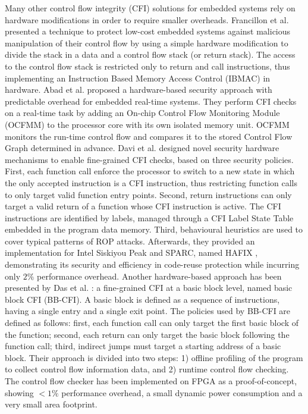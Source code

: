 Many other control flow integrity (CFI) solutions for embedded systems rely on hardware modifications in order to require smaller overheads.
Francillon et al. \cite{hardware-ibmac} presented a technique to protect low-cost embedded systems against malicious manipulation of their control flow
by using a simple hardware modification to divide the stack in a data and a control flow stack (or return stack). The access to the control flow stack is
restricted only to return and call instructions, thus implementing an Instruction Based Memory Access Control (IBMAC) in hardware.
Abad et al. \cite{ocfmm} proposed a hardware-based security approach with predictable overhead for embedded real-time systems.
They perform CFI checks on a real-time task by adding an On-chip Control Flow Monitoring Module (OCFMM) to the processor core with its own isolated memory unit.
OCFMM monitors the run-time control flow and compares it to the stored Control Flow Graph determined in advance.
Davi et al. \cite{fine-grained} designed novel security hardware mechanisms to enable fine-grained CFI checks, based on three security policies.
First, each function call enforce the processor to switch to a new state in which the only accepted instruction is a CFI instruction,
thus restricting function calls to only target valid function entry points. Second, return instructions can only target a valid return of a function whose CFI instruction is active.
The CFI instructions are identified by labels, managed through a CFI Label State Table embedded in the program data memory.
Third, behavioural heuristics are used to cover typical patterns of ROP attacks.
Afterwards, they provided an implementation for Intel Siskiyou Peak and SPARC, named HAFIX \cite{hafix},
demonstrating its security and efficiency in code-reuse protection while incurring only $2\%$ performance overhead.
Another hardware-based approach has been presented by Das et al. \cite{bb-cfi}: a fine-grained CFI at a basic block level, named basic block CFI (BB-CFI).
A basic block is defined as a sequence of instructions, having a single entry and a single exit point.
The policies used by BB-CFI are defined as follows: first, each function call can only target the first basic block of the function;
second, each return can only target the basic block following the function call; third, indirect jumps must target a starting address of a basic block.
Their approach is divided into two steps: 1) offline profiling of the program to collect control flow information data, and 2) runtime control flow checking.
The control flow checker has been implemented on FPGA as a proof-of-concept, showing $<1\%$ performance overhead, a small dynamic power consumption and a very small area footprint.

